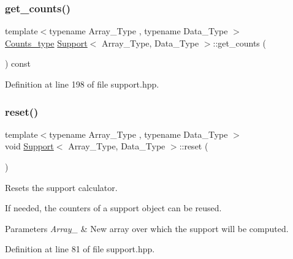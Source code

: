 \subsubsection{\texorpdfstring{get\+\_\+counts()}{get\_counts()}}
{\footnotesize\ttfamily template$<$typename Array\+\_\+\+Type , typename Data\+\_\+\+Type $>$ \\
\hyperlink{typedefs_8hpp_aee40fa17c1fddb63dd1f2b1470ade95b}{Counts\+\_\+type} \hyperlink{class_support}{Support}$<$ Array\+\_\+\+Type, Data\+\_\+\+Type $>$\+::get\+\_\+counts (\begin{DoxyParamCaption}{ }\end{DoxyParamCaption}) const\hspace{0.3cm}{\ttfamily [inline]}}



Definition at line 198 of file support.\+hpp.

\mbox{\label{class_support_a5878ac60282fc1380c92f3ba502f249e}} 
\subsubsection{\texorpdfstring{reset()}{reset()}\hspace{0.1cm}{\footnotesize\ttfamily [1/2]}}
{\footnotesize\ttfamily template$<$typename Array\+\_\+\+Type , typename Data\+\_\+\+Type $>$ \\
void \hyperlink{class_support}{Support}$<$ Array\+\_\+\+Type, Data\+\_\+\+Type $>$\+::reset (\begin{DoxyParamCaption}{ }\end{DoxyParamCaption})\hspace{0.3cm}{\ttfamily [inline]}}



Resets the support calculator. 

If needed, the counters of a support object can be reused.


\begin{DoxyParams}{Parameters}
{\em Array\+\_\+} & New array over which the support will be computed. \\
\hline
\end{DoxyParams}


Definition at line 81 of file support.\+hpp.

\mbox{\label{class_support_afbe207cc2762bc698c9ccb3212e9de78}} 
